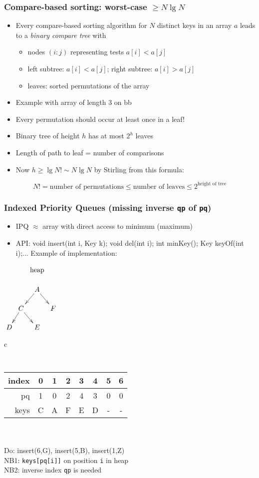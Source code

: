 \documentclass[handout]{beamer}
\begin{document}
\begin{frame}[fragile]
    \frametitle{Compare-based sorting: worst-case $\geq N\lg N$}
\label{comparebasedsorting}
\begin{itemize}[<+->]
\item Every compare-based sorting algorithm for $N$ distinct keys
in an array $a$ leads to a \emph{binary compare tree} with 
 \begin{itemize}[<+->]
 \item nodes $(i{:}j)$ representing tests $a[i]<a[j]$
 \item left subtree: $a[i]<a[j]$; right subtree: $a[i]>a[j]$
 \item leaves: sorted permutations of the array
 \end{itemize}
\item Example with array of length 3 on bb
\item Every permutation should occur at least once in a leaf!
\item Binary tree of height $h$ has at most $2^h$ leaves
\item Length of path to leaf = number of comparisons
\item Now $h\geq \lg N! \sim N \lg N$ by Stirling from this formula:
\end{itemize}
$$ N! = \text{number of permutations}  
     \leq \text{number of leaves} \leq 2^\text{height of tree} $$

\end{frame}

\begin{frame}
    \frametitle{Indexed Priority Queues (missing inverse {\tt qp} of {\tt pq})}
\label{indexedprioqueues}
\begin{itemize}[<+->]
\item IPQ ${\approx}$ array with direct access to minimum (maximum)
\item API: void insert(int i, Key k); void del(int i); int minKey(); Key keyOf(int i);...
Example of implementation:
\end{itemize}
$\xymatrix@R=.5cm@C=.1cm{
&&\text{heap}\\
&&A \ar@{>}[ld]\ar@{>}[rd]&&\\
&C\ar@{>}[ld]\ar@{>}[rd]&&F\\
D&&E&}
$
\begin{tabular}{c}
{\tt
\begin{tabular}{|r|c|c|c|c|c|c|c|}
\hline
index & 0&1&2&3&4&5&6 \\\hline
pq    & 1&0&2&4&3&0&0 \\\hline
keys  & C&A&F&E&D&-&- \\\hline
\end{tabular}
}\\
\\
Do: insert(6,G), insert(5,B), insert(1,Z)\\
NB1: {\tt keys[pq[i]]} on position {\tt i} in heap\\
NB2: inverse index {\tt qp} is needed 
\end{tabular}
\end{frame}
\end{document}
